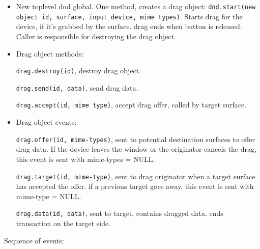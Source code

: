 \documentclass{article}
\begin{document}
\begin{itemize}
\item New toplevel dnd global.  One method, creates a drag object:
  \texttt{dnd.start(new object id, surface, input device, mime
    types)}. Starts drag for the device, if it's grabbed by the
  surface. drag ends when button is released.  Caller is responsible
  for destroying the drag object.

\item Drag object methods:

  \texttt{drag.destroy(id)}, destroy drag object.

  \texttt{drag.send(id, data)}, send drag data.

  \texttt{drag.accept(id, mime type)}, accept drag offer, called by
  target surface.

\item Drag object events:

  \texttt{drag.offer(id, mime-types)}, sent to potential destination
  surfaces to offer drag data.  If the device leaves the window or the
  originator cancels the drag, this event is sent with mime-types =
  NULL.

  \texttt{drag.target(id, mime-type)}, sent to drag originator when a
  target surface has accepted the offer. if a previous target goes
  away, this event is sent with mime-type = NULL.

  \texttt{drag.data(id, data)}, sent to target, contains dragged data.
  ends transaction on the target side.
\end{itemize}

Sequence of events:
\end{document}
